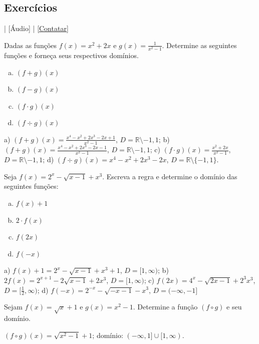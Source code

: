 \subsection*{Exercícios}

\begin{flushright}
  [Vídeo] | [Áudio] | \href{https://phkonzen.github.io/notas/contato.html}{[Contatar]}
\end{flushright}

\begin{exer}
  Dadas as funções $f(x)=x^2+2x$ e $g(x) = \frac{1}{x^2-1}$. Determine as seguintes funções e forneça seus respectivos domínios.
  \begin{enumerate}[a)]
  \item $(f+g)(x)$
  \item $(f-g)(x)$
  \item $(f\cdot g)(x)$
  \item $(f\div g)(x)$
  \end{enumerate}
\end{exer}
\begin{resp}
  a) $\displaystyle (f+g)(x)=\frac{x^4-x^2+2x^3-2x+1}{x^2-1}$, $D=\mathbb{R}\setminus{-1,1}$; b) $\displaystyle (f+g)(x)=\frac{x^4-x^2+2x^3-2x-1}{x^2-1}$, $D=\mathbb{R}\setminus{-1,1}$; c) $\displaystyle (f\cdot g)(x) = \frac{x^2+2x}{x^2-1}$, $D=\mathbb{R}\setminus{-1,1}$;  d) $\displaystyle (f\div g)(x) = x^4-x^2+2x^3-2x$, $D=\mathbb{R}\setminus\{-1,1\}$.
\end{resp}

\begin{exer}
  Seja $f(x) = 2^x - \sqrt{x-1} + x^3$. Escreva a regra e determine o domínio das seguintes funções:
  \begin{enumerate}[a)]
  \item $f(x) + 1$
  \item $2\cdot f(x)$
  \item $f(2x)$
  \item $f(-x)$
  \end{enumerate}
\end{exer}
\begin{resp}
  a) $f(x)+1 = 2^x - \sqrt{x-1} + x^3 + 1$, $D=[1,\infty)$; b) $2f(x) = 2^{x+1} - 2\sqrt{x-1} + 2x^3$, $D=[1,\infty)$; c) $f(2x)=4^x-\sqrt{2x-1}+2^3x^3$, $D=[\frac{1}{2},\infty)$; d) $f(-x)=2^{-x}-\sqrt{-x-1}-x^3$, $D=(-\infty, -1]$ 
\end{resp}

\begin{exer}
  Sejam $f(x) = \sqrt{x}+1$ e $g(x) = x^2 -1$. Determine a função $(f\circ g)$ e seu domínio.
\end{exer}
\begin{resp}
  $(f\circ g)(x) = \sqrt{x^2-1}+1$; domínio: $(-\infty, 1]\cup [1, \infty)$.
\end{resp}

